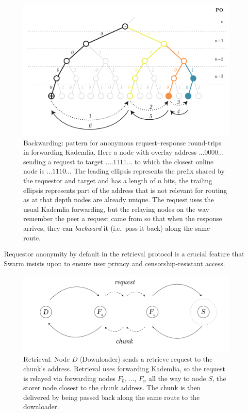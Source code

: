 \begin{figure}[htbp]
   \centering
   \includegraphics[width=\textwidth]{fig/request-response-forwarding.pdf}
   \caption[Backwarding: a pattern for anonymous request-response round-trips in forwarding Kademlia \statusgreen]{Backwarding: pattern for anonymous request--response round-trips in forwarding Kademlia. Here a node with overlay address $...0000...$ sending a request to target $....1111...$ to which the closest online node is $...1110...$ The leading ellipsis represents the prefix shared by the requestor and target and has a length of $n$ bits, the trailing ellipsis represents part of the address that is not relevant for routing as at that depth nodes are already unique. The request uses the usual Kademlia forwarding, but the relaying nodes on the way remember the peer a request came from so that when the response arrives, they can \emph{backward} it (i.e.\ pass it back) along the same route.}
   \label{fig:request-response}
\end{figure}

Requestor anonymity by default in the retrieval protocol is a crucial feature that Swarm insists upon to ensure user privacy and censorship-resistant access.

\begin{figure}[htbp]
   \centering
   \includegraphics[width=\textwidth]{fig/retrieval.pdf}
   \caption[Retrieval \statusgreen]{Retrieval. Node $D$ (Downloader) sends a retrieve request to the chunk's address. Retrieval uses forwarding Kademlia, so the request is relayed via forwarding nodes $F_0$, ..., $F_n$ all the way to node $S$, the storer node closest to the chunk address. The chunk is then delivered by being passed back along the same route to the downloader.}
   \label{fig:retrieval}
\end{figure}


